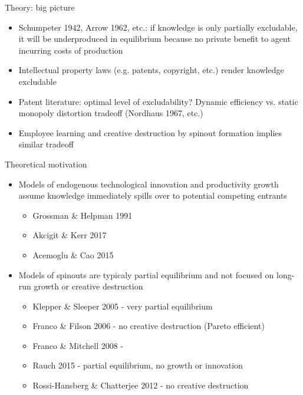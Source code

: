 \documentclass[english,usenames,dvipsnames]{beamer}
\begin{document}
\begin{frame}{Theory: big picture}
\label{theory_big_picture}
\begin{itemize}
	\item Schumpeter 1942, Arrow 1962, etc.: if knowledge is only partially excludable, it will be underproduced in equilibrium because no private benefit to agent incurring costs of production
	\item Intellectual property laws (e.g. patents, copyright, etc.) render knowledge excludable
	\item Patent literature: optimal level of excludability? Dynamic efficiency vs. static monopoly distortion tradeoff (Nordhaus 1967, etc.)
	\item Employee learning and creative destruction by spinout formation implies similar tradeoff
\end{itemize}
\end{frame}


\begin{frame}{Theoretical motivation}
\begin{itemize}
	\item Models of endogenous technological innovation and productivity growth assume knowledge immediately spills over to potential competing entrants
	\begin{itemize}
		\item Grossman \& Helpman 1991 
		\item Akcigit \& Kerr 2017
		\item Acemoglu \& Cao 2015
	\end{itemize}
	\item Models of spinouts are typicaly partial equilibrium and not focused on long-run growth or creative destruction
	\begin{itemize}
		\item Klepper \& Sleeper 2005 - very partial equilibrium 
		\item Franco \& Filson 2006 - no creative destruction  (Pareto efficient)
		\item Franco \& Mitchell 2008 - 
		\item Rauch 2015 - partial equilibrium, no growth or innovation	\item Rossi-Hansberg \& Chatterjee 2012 - no creative destruction
	\end{itemize}
\end{itemize}
\end{frame}
\end{document}
